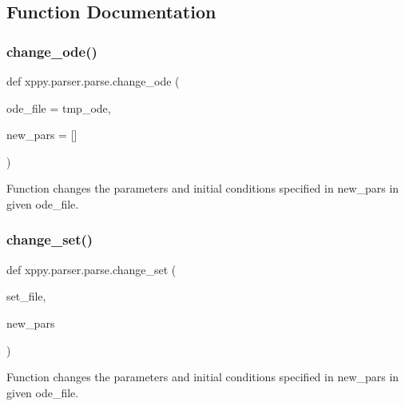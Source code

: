 \subsection{Function Documentation}
\mbox{\label{namespacexppy_1_1parser_1_1parse_aac794ef9d9e9168bb0286bdda25e5600}} 
\subsubsection{\texorpdfstring{change\+\_\+ode()}{change\_ode()}}
{\footnotesize\ttfamily def xppy.\+parser.\+parse.\+change\+\_\+ode (\begin{DoxyParamCaption}\item[{}]{ode\+\_\+file = {\ttfamily tmp\+\_\+ode},  }\item[{}]{new\+\_\+pars = {\ttfamily \mbox{[}\mbox{]}} }\end{DoxyParamCaption})}

\begin{DoxyVerb}Function changes the parameters and initial conditions specified in
new_pars in given ode_file. 
\end{DoxyVerb}
 \mbox{\label{namespacexppy_1_1parser_1_1parse_ae61c7e82ae565801f9facea020627023}} 
\subsubsection{\texorpdfstring{change\+\_\+set()}{change\_set()}}
{\footnotesize\ttfamily def xppy.\+parser.\+parse.\+change\+\_\+set (\begin{DoxyParamCaption}\item[{}]{set\+\_\+file,  }\item[{}]{new\+\_\+pars }\end{DoxyParamCaption})}

\begin{DoxyVerb}Function changes the parameters and initial conditions specified in
new_pars in given ode_file. 
\end{DoxyVerb}
 \mbox{\label{namespacexppy_1_1parser_1_1parse_a655d9a7521dcd4ad6911e08b58f21095}} 

